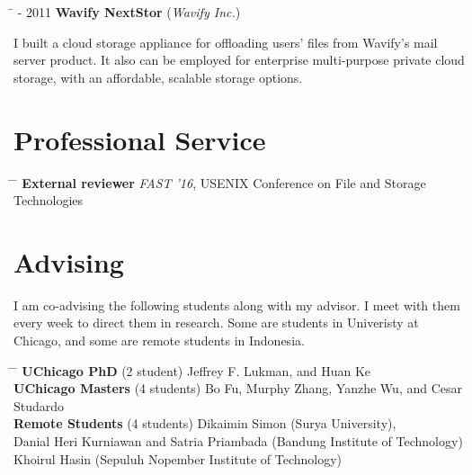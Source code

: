 \documentclass[10pt]{article} %
\begin{document}
\begin{tabbing}
\hspace{2.5cm} \=  - 2011 \>\+ \textbf{Wavify NextStor} (\textit{Wavify Inc.}) \\
\begin{minipage}{\smallertextwidth}
I built a cloud storage appliance for offloading users' files from Wavify's
mail server product. It also can be employed for enterprise multi-purpose
private cloud storage, with an affordable, scalable storage options.
\end{minipage}
\end{tabbing}


\section{Professional Service}

\begin{tabbing}
\hspace{2.5cm} \= \hspace{3.5cm}  \=  \> \textbf{External reviewer} \> \textit{FAST '16}, USENIX Conference on File and Storage Technologies
\end{tabbing}


\section{Advising}

I am co-advising the following students along with my advisor. I meet with them
every week to direct them in research. Some are students in Univeristy at
Chicago, and some are remote students in Indonesia.
\begin{tabbing}
\hspace{3.5cm} \= \hspace{2.5cm} \= \kill
\textbf{UChicago PhD} \> (2 student) \> Jeffrey F. Lukman, and Huan Ke\\
\textbf{UChicago Masters} \> (4 students) \> Bo Fu, Murphy Zhang, Yanzhe Wu, and Cesar Studardo\\
\textbf{Remote Students} \> (4 students) \> Dikaimin Simon (Surya University),\\
\> \>Danial Heri Kurniawan and Satria Priambada (Bandung Institute of Technology)\\
\> \>Khoirul Hasin (Sepuluh Nopember Institute of Technology)
\end{tabbing}
\end{document}
